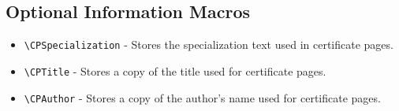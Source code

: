 \subsection{Optional Information Macros}
\begin{itemize}
	\item \texttt{\textbackslash CPSpecialization} - Stores the specialization text used in certificate pages.
	\item \texttt{\textbackslash CPTitle} - Stores a copy of the title used for certificate pages.
	\item \texttt{\textbackslash CPAuthor} - Stores a copy of the author's name used for certificate pages.
\end{itemize}



